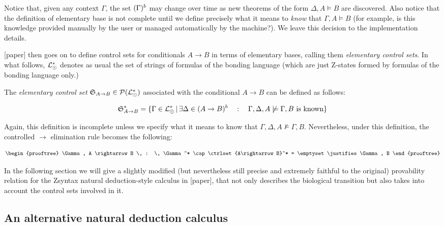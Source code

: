Notice that, given any context $\Gamma$, the set $(\Gamma)^{b}$ may change
over time as new theorems of the form $\Delta, A \models B$ are discovered.
Also notice that the definition of elementary base is not complete until we
define precisely what it means to \emph{know} that $\Gamma, A \models B$ (for
example, is this knowledge provided manually by the user or managed
automatically by the machine?). We leave this decision to the implementation
details.

[paper] then goes on to define control sets for conditionals $A \rightarrow B$
in terms of elementary bases, calling them \emph{elementary control sets}.  In
what follows, $\mathcal{L}_{\odot}^*$ denotes as usual the set of strings of formulas
of the bonding language (which are just Z-states formed by formulas of the
bonding language only.)

\begin{definition}
  The \emph{elementary control set}
  $\mathfrak{S}_{A \rightarrow B} \in \mathcal{P}(\mathcal{L}_{\odot}^*)$ associated with
  the conditional $A \rightarrow B$ can be defined as follows:

  \[
    \mathfrak{S}_{A \rightarrow B}^* = \{
    \Gamma \in \mathcal{L}_{\odot}^* \, | \, \exists \Delta \in (A \rightarrow
    B)^{b}
    \quad : \quad \Gamma, \Delta, A \not \models \Gamma, B \text{ is known}
    \}
  \]
\end{definition}

Again, this definition is incomplete unless we specify what it means to know
that $\Gamma, \Delta, A \not \models \Gamma, B$. Nevertheless, under this
definition, the controlled $\rightarrow$ elimination rule becomes the following:

\[
  \begin{prooftree}
    \Gamma, A \rightarrow B \, : \, \Gamma^* \cap \ctrlset{A\rightarrow B}^* =
    \emptyset
    \justifies
    \Gamma, B
  \end{prooftree}
\]

In the following section we will give a slightly modified (but nevertheless
still precise and extremely faithful to the original) provability relation for
the Zsyntax natural deduction-style calculus in [paper], that not only describes
the biological transition but also takes into account the control sets involved
in it.

\subsection{An alternative natural deduction calculus}

